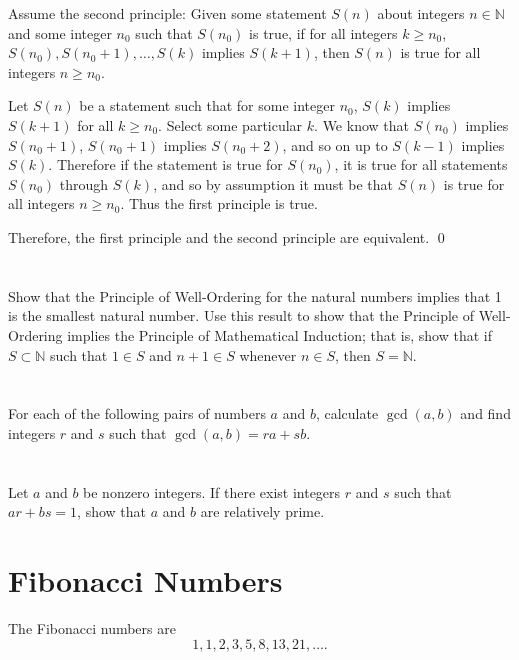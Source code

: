 \medskip

Assume the second principle: Given some statement $S(n)$ about integers $n \in \mathbb{N}$ and some integer $n_0$ such that $S(n_0)$ is true, if for all integers $k \geq n_0$, $S(n_0), S(n_0 + 1), \dots, S(k)$ implies $S(k+1)$, then $S(n)$ is true for all integers $n \geq n_0$.

Let $S(n)$ be a statement such that for some integer $n_0$, $S(k)$ implies $S(k+1)$ for all $k \geq n_0$. Select some particular $k$. We know that $S(n_0)$ implies $S(n_0 + 1)$, $S(n_0 + 1)$ implies $S(n_0 + 2)$, and so on up to $S(k-1)$ implies $S(k)$. Therefore if the statement is true for $S(n_0)$, it is true for all statements $S(n_0)$ through $S(k)$, and so by assumption it must be that $S(n)$ is true for all integers $n \geq n_0$. Thus the first principle is true.

Therefore, the first principle and the second principle are equivalent.
\qed
\section{}\label{sec:2-14}

Show that the Principle of Well-Ordering for the natural numbers implies that 1 is the smallest natural number. Use this result to show that the Principle of Well-Ordering implies the Principle of Mathematical Induction; that is, show that if $S \subset \mathbb{N}$ such that $1 \in S$ and $n + 1 \in S$ whenever $n \in S$, then $S = \mathbb{N}$.
\hr
\section{}\label{sec:2-15}

For each of the following pairs of numbers $a$ and $b$, calculate $\gcd(a,b)$ and find integers $r$ and $s$ such that $\gcd(a,b) = ra + sb$.
\hr
\section{}\label{sec:2-16}

Let $a$ and $b$ be nonzero integers. If there exist integers $r$ and $s$ such that $ar + bs = 1$, show that $a$ and $b$ are relatively prime.
\hr
\section{Fibonacci Numbers}\label{sec:2-17}

The Fibonacci numbers are
\[1,1,2,3,5,8,13,21,\dots.\]

